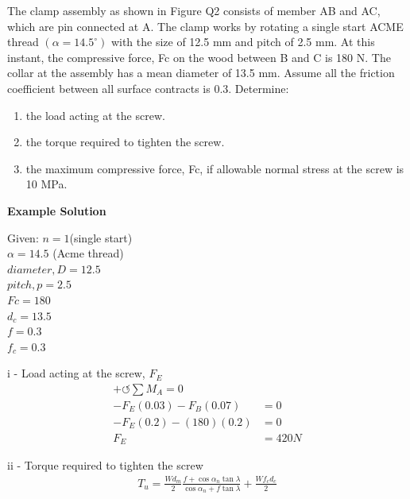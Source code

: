 \documentclass[a4paper, fleqn]{article}
\begin{document}
The clamp assembly as shown in Figure Q2 consists of member AB and AC, which are pin connected at A. The clamp works by rotating a single start ACME thread $(\alpha=14.5^{\circ})$ with the size of 12.5 mm and pitch of 2.5 mm. At this instant, the compressive force, Fc on the wood between B and C is 180 N. The collar at the assembly has a mean diameter of 13.5 mm. Assume all the friction coefficient between all surface contracts is 0.3. Determine:

\begin{enumerate}[label=(\roman*)]
    \item the load acting at the screw.

    \item the torque required to tighten the screw.

    \item the maximum compressive force, Fc, if allowable normal stress at the screw is 10 MPa.
\end{enumerate}


\textbf{Example Solution}

Given:
$n = 1$(single start)\\
$\alpha = 14.5$ (Acme thread)\\
$diameter,D = 12.5$\\
$pitch,p = 2.5$\\
$Fc = 180$\\
$d_c = 13.5$\\
$f = 0.3$\\
$f_c = 0.3$\\
\vspace{10pt}

i - Load acting at the screw, $F_E$
\begin{equation*}
    \begin{aligned}
    +\circlearrowleft \sum M_A =0\\  
    -F_E(0.03)-F_B(0.07) &=0\\ 
    -F_E(0.2)-(180)(0.2) &=0\\ 
    F_E &= 420  N
    \end{aligned}
\end{equation*}

ii - Torque required to tighten the screw
\begin{equation*}
    \begin{aligned}
    T_u = \frac{Wd_m}{2} \frac{f+\cos\alpha_n \tan\lambda}{\cos\alpha_n + f\tan\lambda} + \frac{Wf_c d_c}{2}
    \end{aligned}
\end{equation*}
\end{document}
